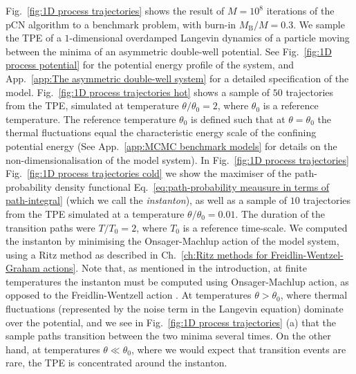 Fig.~\ref{fig:1D process trajectories} shows the result of $M=10^8$ iterations of the pCN algorithm to a benchmark problem, with burn-in $M_\text{B}/M = 0.3$. We sample the TPE of a $1$-dimensional overdamped Langevin dynamics of a particle moving between the minima of an asymmetric double-well potential. See Fig.~\ref{fig:1D process potential} for the potential energy profile of the system, and App.~\ref{app:The asymmetric double-well system} for a detailed specification of the model. Fig.~\ref{fig:1D process trajectories hot} shows a sample of $50$ trajectories from the TPE, simulated at temperature $\theta/\theta_0 = 2$, where $\theta_0$ is a reference temperature. The reference temperature $\theta_0$ is defined such that at $\theta = \theta_0$ the thermal fluctuations equal the characteristic energy scale of the confining potential energy (See App.~\ref{app:MCMC benchmark models} for details on the non-dimensionalisation of the model system). In Fig.~\ref{fig:1D process trajectories} Fig.~\ref{fig:1D process trajectories cold} we show the maximiser of the path-probability density functional Eq.~\ref{eq:path-probability meausure in terms of path-integral} (which we call the \textit{instanton}), as well as a sample of $10$ trajectories from the TPE simulated at a temperature $\theta/\theta_0 = 0.01$. The duration of the transition paths were $T /T_0 = 2$, where $T_0$ is a reference time-scale. We computed the instanton by minimising the Onsager-Machlup action of the model system, using a Ritz method as described in Ch.~\ref{ch:Ritz methods for Freidlin-Wentzel-Graham actions}. Note that, as mentioned in the introduction, at finite temperatures the instanton must be computed using Onsager-Machlup action, as opposed to the Freidlin-Wentzell action \citep{gladrowExperimentalMeasurementRelative2021, adibStochasticActionsDiffusive2008}. At temperatures $\theta > \theta_0$, where thermal fluctuations (represented by the noise term in the Langevin equation) dominate over the potential, and we see in Fig.~\ref{fig:1D process trajectories} (a) that the sample paths transition between the two minima several times. On the other hand, at temperatures $\theta \ll \theta_0$, where we would expect that transition events are rare, the TPE is concentrated around the instanton.


